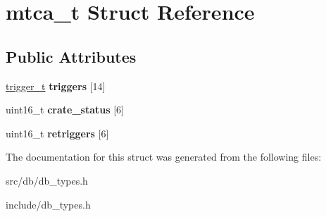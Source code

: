 \hypertarget{structmtca__t}{
\section{mtca\_\-t Struct Reference}
\label{structmtca__t}
}
\subsection*{Public Attributes}
\begin{DoxyCompactItemize}
\item 
\hypertarget{structmtca__t_a556edc50888a0fc188776b83cced21a5}{
\hyperlink{structtrigger__t}{trigger\_\-t} {\bfseries triggers} \mbox{[}14\mbox{]}}
\label{structmtca__t_a556edc50888a0fc188776b83cced21a5}

\item 
\hypertarget{structmtca__t_a77b362cfae951a70d93685b34dfbbb57}{
uint16\_\-t {\bfseries crate\_\-status} \mbox{[}6\mbox{]}}
\label{structmtca__t_a77b362cfae951a70d93685b34dfbbb57}

\item 
\hypertarget{structmtca__t_ac4683d3ad0d8c5bde46ed98309078db8}{
uint16\_\-t {\bfseries retriggers} \mbox{[}6\mbox{]}}
\label{structmtca__t_ac4683d3ad0d8c5bde46ed98309078db8}

\end{DoxyCompactItemize}


The documentation for this struct was generated from the following files:\begin{DoxyCompactItemize}
\item 
src/db/db\_\-types.h\item 
include/db\_\-types.h\end{DoxyCompactItemize}
